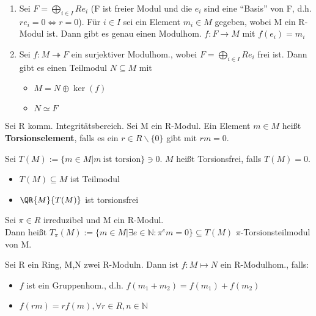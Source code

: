 \begin{theorem}
\leavevmode
\begin{enumerate}
	\item Sei $F = \bigoplus \limits_{i \in I} R e_i $ (F ist freier Modul und die $e_i$ sind eine \enquote{Basis} von F, d.h. $r e_i = 0 \Leftrightarrow r=0$).
	Für $i\in I$ sei ein Element $m_i \in M$ gegeben, wobei M ein R-Modul ist.
	Dann gibt es genau einen Modulhom. $f:F \rightarrow M $ mit $f(e_i) = m_i$
	\item Sei $f:M \twoheadrightarrow F$ ein surjektiver Modulhom., wobei $F = \bigoplus \limits_{i \in I}R e_i$ frei ist. Dann gibt es einen Teilmodul $N \subseteq M$ mit
	\begin{itemize}
		\item $M = N \oplus \ker(f)$
		\item $N \simeq F$
	\end{itemize}
\end{enumerate}
\end{theorem}

\begin{definition}
Sei R komm. Integritätsbereich. Sei M ein R-Modul. Ein Element $m\in M$ heißt \textbf{Torsionselement}, falls es ein $r\in R \backslash \{0\}$ gibt mit $rm=0$.

Sei $T(M) := \{m \in M | m~\text{ist torsion} \} \ni 0$. $M$ heißt Torsionsfrei, falls $T(M) = 0$.
\end{definition}

\begin{remark}
\leavevmode
\begin{itemize}
	\item $T(M) \subseteq M$ ist Teilmodul
	\item $\QR{M}{T(M)}$ ist torsionsfrei
\end{itemize}
\end{remark}

\begin{definition}
Sei $\pi \in R$ irreduzibel und M ein R-Modul.\\
Dann heißt $T_\pi (M):= \{m \in M | \exists e \in \mathbb{N}: \pi^em = 0 \} \subseteq T(M)$ $\pi$-Torsionsteilmodul von M.
\end{definition}

\begin{definition}
Sei R ein Ring, M,N zwei R-Moduln. Dann ist $f:M\mapsto N$ ein R-Modulhom., falls:
\begin{itemize}
	\item $f$ ist ein Gruppenhom., d.h. $f(m_1+m_2) = f(m_1)+f(m_2)$
	\item $f(rm) = rf(m), \forall r \in R, n\in \mathbb{N}$
\end{itemize}
\end{definition}

